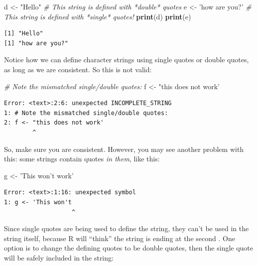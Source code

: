 \documentclass[
]{book}
\newenvironment{Shaded}{\begin{snugshade}}{\end{snugshade}}
\newcommand{\CommentTok}[1]{\textcolor[rgb]{0.56,0.35,0.01}{\textit{#1}}}
\newcommand{\KeywordTok}[1]{\textcolor[rgb]{0.13,0.29,0.53}{\textbf{#1}}}
\newcommand{\NormalTok}[1]{#1}
\newcommand{\StringTok}[1]{\textcolor[rgb]{0.31,0.60,0.02}{#1}}
\begin{document}
\begin{Shaded}
\begin{Highlighting}[]
\NormalTok{d <-}\StringTok{ "Hello"}         \CommentTok{# This string is defined with   *double*   quotes }
\NormalTok{e <-}\StringTok{ 'how are you?'}  \CommentTok{# This string is defined with   *single*   quotes!}
\KeywordTok{print}\NormalTok{(d)}
\KeywordTok{print}\NormalTok{(e)}
\end{Highlighting}
\end{Shaded}

\begin{verbatim}
[1] "Hello"
[1] "how are you?"
\end{verbatim}

Notice how we can define character strings using single quotes or double quotes, as long as we are consistent.
So this is not valid:

\begin{Shaded}
\begin{Highlighting}[]
\CommentTok{# Note the mismatched single/double quotes:}
\NormalTok{f <-}\StringTok{ "this does not work' }
\end{Highlighting}
\end{Shaded}

\begin{verbatim}
Error: <text>:2:6: unexpected INCOMPLETE_STRING
1: # Note the mismatched single/double quotes:
2: f <- "this does not work' 
        ^
\end{verbatim}

So, make sure you are consistent.
However, you may see another problem with this: some strings contain quotes \emph{in them}, like this:

\begin{Shaded}
\begin{Highlighting}[]
\NormalTok{g <-}\StringTok{ 'This won'}\NormalTok{t work}\StringTok{'}
\end{Highlighting}
\end{Shaded}

\begin{verbatim}
Error: <text>:1:16: unexpected symbol
1: g <- 'This won't
                   ^
\end{verbatim}

Since single quotes are being used to define the string, they can't be used in the string itself, because R will ``think'' the string is ending at the second \texttt{\textquotesingle{}}.
One option is to change the defining quotes to be double quotes, then the single quote will be safely included in the string:
\end{document}
